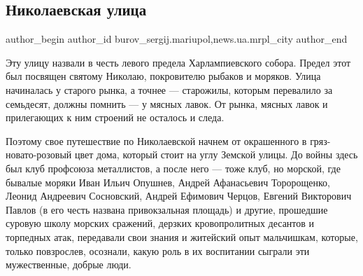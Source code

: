  
 
 
 
 
 
\subsection{Николаевская улица}
\label{sec:17_12_2017.stz.news.ua.mrpl_city.1.nikolaevskaja_ulica}
 
\ifcmt
 author_begin
   author_id burov_sergij.mariupol,news.ua.mrpl_city
 author_end
\fi

Эту улицу назвали в честь левого предела Харлампиевского собора. Предел этот
был посвящен святому Николаю, покровителю рыбаков и моряков. Улица начиналась у
старого рынка, а точнее — старожилы, которым перевалило за семьдесят,  должны
помнить — у мясных лавок. От рынка, мясных лавок и прилегающих к ним строений
не осталось и следа.


Поэтому свое путешествие по Николаевской начнем от окрашенного в
гряз\hyp{}новато-розовый цвет дома, который  стоит на углу Земской улицы. До войны
здесь был клуб профсоюза металлистов, а после него — тоже клуб, но морской, где
бывалые моряки Иван Ильич Опушнев, Андрей Афанасьевич Торорощенко, Леонид
Андреевич Сосновский, Андрей Ефимович Черцов, Евгений Викторович Павлов (в его
честь названа привокзальная площадь) и другие, прошедшие суровую школу морских
сражений, дерзких кровопролитных десантов и торпедных атак, передавали свои
знания и житейский опыт мальчишкам, которые, только повзрослев, осознали, какую
роль в их воспитании сыграли эти мужественные, добрые люди.

